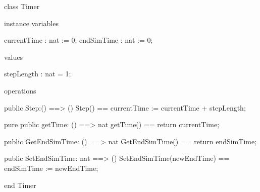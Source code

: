 \documentclass[a4paper]{article}
\begin{document}
\title{}
\author{}
\begin{vdm_al}
class Timer 

instance variables

  currentTime : nat := 0;
  endSimTime : nat := 0;

values 

  stepLength : nat = 1;

operations

public 
  Step:() ==> ()
  Step() == 
    currentTime := currentTime + stepLength;

pure public
  getTime: () ==> nat 
  getTime() == 
  return currentTime;
  
public
  GetEndSimTime: () ==> nat
  GetEndSimTime() == 
  return endSimTime;

public SetEndSimTime: nat ==> ()
SetEndSimTime(newEndTime) == 
  endSimTime := newEndTime;

end Timer
\end{vdm_al}
\end{document}
